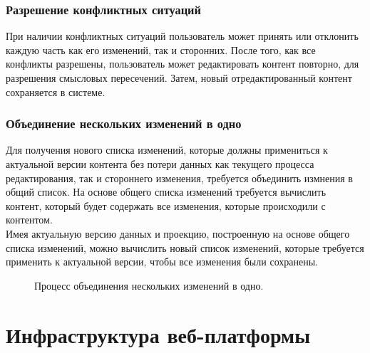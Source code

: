 \documentclass[a4paper,14pt]{extreport} %
\begin{document}
\subsubsection{Разрешение конфликтных ситуаций}

При наличии конфликтных ситуаций пользователь может принять или отклонить каждую часть как его изменений, так и сторонних.
После того, как все конфликты разрешены, пользователь может редактировать контент повторно, для разрешения смысловых пересечений. Затем, новый отредактированный контент сохраняется в системе.

\newpage
\subsubsection{Объединение нескольких изменений в одно}

Для получения нового списка изменений, которые должны примениться к актуальной версии контента без потери данных как текущего процесса редактирования, так и стороннего изменения, требуется объединить измнения в общий список. На основе общего списка изменений требуется вычислить контент, который будет содержать все изменения, которые происходили с контентом. \\
Имея актуальную версию данных и проекцию, построенную на основе общего списка изменений, можно вычислить новый список изменений, которые требуется применить к актуальной версии, чтобы все изменения были сохранены.

\begin{figure}[H]
\caption{Процесс объединения нескольких изменений в одно.}
\label{check-conflicts-process}
\end{figure}

\newpage
\section{Инфраструктура веб-платформы}
\end{document}
